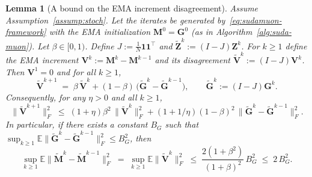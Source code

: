 \documentclass{article}
\newtheorem{lemma}{Lemma}
\begin{document}
\begin{lemma}[A bound on the EMA increment disagreement]
\label{lem:sudamuon-ema-increment-disagreement}
Assume Assumption~\ref{assump:stoch}.
Let the iterates be generated by~\eqref{eq:sudamuon-framework} with the EMA initialization $\mathbf M^0=\mathbf G^0$ (as in Algorithm~\ref{alg:suda-muon}).
Let $\beta\in[0,1)$.
Define $J:=\tfrac1N\mathbf{1}\mathbf{1}^\top$ and $\tilde{\mathbf Z}^k:=(I-J)\mathbf Z^k$.
For $k\ge 1$ define the EMA increment $\mathbf V^{k}:=\mathbf M^{k}-\mathbf M^{k-1}$ and its disagreement $\tilde{\mathbf V}^k:=(I-J)\mathbf V^k$.
Then $\mathbf V^1=0$ and for all $k\ge 1$,
\begin{equation}
\label{eq:sudamuon-V-rec}
\tilde{\mathbf V}^{k+1} 
\;=\; \beta\,\tilde{\mathbf V}^{k} + (1-\beta)\,\bigl(\tilde{\mathbf G}^{k}-\tilde{\mathbf G}^{k-1}\bigr),
\qquad \tilde{\mathbf G}^k:=(I-J)\mathbf G^k.
\end{equation}
Consequently, for any $\eta>0$ and all $k\ge 1$,
\begin{equation}
\label{eq:sudamuon-V-sq-rec}
\|\tilde{\mathbf V}^{k+1}\|_F^2
\;\le\; (1+\eta)\beta^2\,\|\tilde{\mathbf V}^{k}\|_F^2
+ (1+1/\eta)(1-\beta)^2\,\|\tilde{\mathbf G}^{k}-\tilde{\mathbf G}^{k-1}\|_F^2.
\end{equation}
In particular, if there exists a constant $B_G$ such that
$\sup_{k\ge 1}\mathbb{E}\|\tilde{\mathbf G}^{k}-\tilde{\mathbf G}^{k-1}\|_F^2\le B_G^2$,
then
\begin{equation}
\label{eq:sudamuon-V-uniform}
\sup_{k\ge 1}\mathbb{E}\|\tilde{\mathbf M}^{k}-\tilde{\mathbf M}^{k-1}\|_F^2
\;=\;\sup_{k\ge 1}\mathbb{E}\|\tilde{\mathbf V}^{k}\|_F^2
\;\le\;
\frac{2(1+\beta^2)}{(1+\beta)^2}\,B_G^2
\;\le\; 2\,B_G^2.
\end{equation}
\end{lemma}
\end{document}
